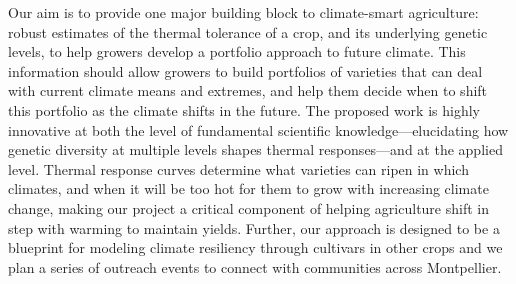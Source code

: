 \documentclass[11pt,letter,oneside]{article}
\begin{document}
Our aim is to provide one major building block to climate-smart agriculture: robust estimates of the thermal tolerance of a crop, and its underlying genetic levels, to help growers develop a portfolio approach to future climate. This information should allow growers to build portfolios of varieties that can deal with current climate means and extremes, and help them decide when to shift this portfolio as the climate shifts in the future. The proposed work is highly innovative at both the level of fundamental scientific knowledge---elucidating how genetic diversity at multiple levels shapes thermal responses---and at the applied level. Thermal response curves determine what varieties can ripen in which climates, and when it will be too hot for them to grow with increasing climate change, making our project a critical component of helping agriculture shift in step with warming to maintain yields. Further, our approach is designed to be a blueprint for modeling climate resiliency through cultivars in other crops and we plan a series of outreach events to connect with communities across Montpellier. 
\end{document}
